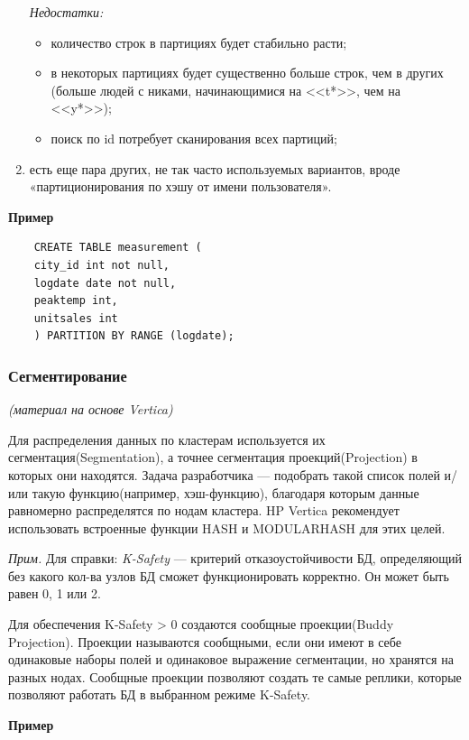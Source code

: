 \begin{enumerate}
	\textit{Недостатки:}
	\begin{itemize}[label=--]
		\item количество строк в партициях будет стабильно расти; 
		\item в некоторых партициях будет существенно больше строк, чем в других (больше людей с никами, начинающимися на <<t*>>, чем на <<y*>>); 
		\item поиск по id потребует сканирования всех партиций;
	\end{itemize}
	
	\item есть еще пара других, не так часто используемых вариантов, вроде «партиционирования по
	хэшу от имени пользователя». 
	
\end{enumerate}

\textbf{Пример}

\begin{lstlisting}
	CREATE TABLE measurement (	
	city_id int not null,
	logdate date not null,
	peaktemp int,
	unitsales int
	) PARTITION BY RANGE (logdate);
\end{lstlisting}

\subsubsection{Сегментирование}
\textit{(материал на основе Vertica)}

Для распределения данных по кластерам используется их сегментация(Segmentation), а точнее сегментация проекций(Projection) в которых они находятся. Задача разработчика --- подобрать такой список полей и/или такую функцию(например, хэш-функцию), благодаря которым данные равномерно распределятся по нодам кластера. HP Vertica рекомендует
использовать встроенные функции HASH и MODULARHASH для этих целей. 

\textit{Прим.} Для справки: \textit{K-Safety} --- критерий отказоустойчивости БД, определяющий без какого кол-ва узлов БД сможет функционировать корректно. Он может быть равен 0, 1 или 2.

Для обеспечения K-Safety > 0 создаются сообщные проекции(Buddy Projection). Проекции называются сообщными, если они имеют в себе одинаковые наборы полей и одинаковое выражение сегментации, но хранятся на разных нодах. Сообщные проекции позволяют создать те самые реплики, которые позволяют работать БД в выбранном режиме K-Safety. 

\textbf{Пример}

